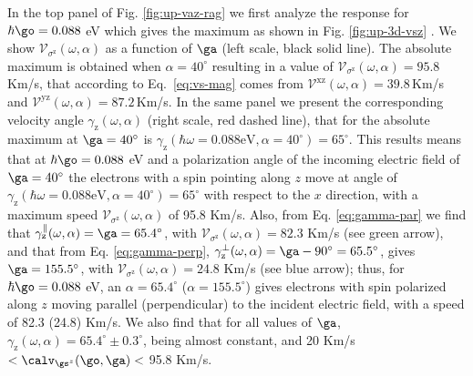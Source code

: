 \documentclass[prb,11pt,tightenlines,twocolumn,aps]{revtex4-1}
\begin{document}
In the top panel of Fig. \ref{fig:up-vaz-rag} we first analyze the
response for
$\hbar\go= 0.088$ eV which gives the maximum as shown
in Fig. \ref{fig:up-3d-vsz} . 
We show 
$\mathcal{V}_{\sigma^{\mathrm{z}}} (\omega,\alpha)$
as a function of $\ga$
(left scale, black solid line). 
The absolute maximum is obtained when
$\alpha = 40^{\circ}$ resulting in a value of
$\mathcal{V}_{\sigma^{\mathrm{z}}} (\omega,\alpha) = 95.8$\,Km/s, 
that according to Eq.~\eqref{eq:vs-mag} 
comes from 
$\mathcal{V}^{\mathrm{xz}}(\omega,\alpha)=39.8$\,Km/s and
$\mathcal{V}^{\mathrm{yz}}(\omega,\alpha)=87.2$\,Km/s.
% 
In the same panel we present the corresponding velocity angle
$\gamma_{\mathrm{z}}(\omega,\alpha)$ (right scale, red dashed line), that for
the absolute maximum at $\ga=40^\circ$ is
$\gamma_{\mathrm{z}}(\hbar\omega=0.088\text{eV},\alpha=40^\circ) = 65^{\circ}$. 
This results means that at $\hbar\go=0.088$ eV and a polarization
angle of the incoming 
electric field of $\ga=40^\circ$ 
the electrons with a spin pointing along $z$ move at angle of 
$\gamma_{\mathrm{z}}(\hbar\omega=0.088\text{eV},\alpha=40^\circ) =
65^{\circ}$
with respect to the $x$ direction,  
with a  maximum speed
$\mathcal{V}_{\sigma^{\mathrm{z}}} (\omega,\alpha)$ of  95.8 Km/s.
Also,
from Eq. \eqref{eq:gamma-par} we find that 
$\gamma^\parallel_{\mathrm{z}}(\omega,\alpha)=\ga=65.4^\circ$, with
$\mathcal{V}_{\sigma^{\mathrm{z}}}(\omega,\alpha) = 82.3$ Km/s 
(see green arrow),  
and 
that from Eq. \eqref{eq:gamma-perp}, 
$\gamma^\perp_{\mathrm{z}}(\omega,\alpha)=\ga-90^\circ=65.5^\circ$,
gives $\ga=155.5^\circ$, with  
$\mathcal{V}_{\sigma^{\mathrm{z}}}(\omega,\alpha) = 24.8$ Km/s
(see blue arrow); thus, for $\hbar\go=0.088$ eV, an
$\alpha=65.4^\circ$ ($\alpha=155.5^\circ$) gives 
electrons with spin polarized along $z$
moving 
parallel (perpendicular) to the
incident electric field,  with a speed of 82.3 (24.8) Km/s. 
% 
We also find that for all values of $\ga$,
$\gamma_{\mathrm{z}}(\omega,\alpha) =65.4^{\circ}\pm 0.3^{\circ}$,
being almost constant, and 20 Km/s $<\calv_{\gs^z}(\go,\ga)<$ 95.8 Km/s.
% 
\end{document}
